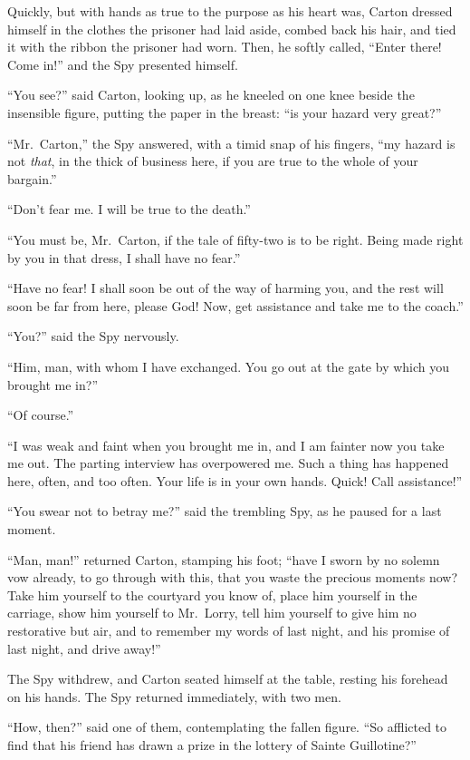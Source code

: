 Quickly, but with hands as true to the purpose as his heart was,
Carton dressed himself in the clothes the prisoner had laid aside,
combed back his hair, and tied it with the ribbon the prisoner had
worn.  Then, he softly called, ``Enter there!  Come in!'' and the Spy
presented himself.

``You see?'' said Carton, looking up, as he kneeled on one knee beside
the insensible figure, putting the paper in the breast:  ``is your
hazard very great?''

``Mr.\ Carton,'' the Spy answered, with a timid snap of his fingers,
``my hazard is not \emph{that}, in the thick of business here, if you are
true to the whole of your bargain.''

``Don't fear me.  I will be true to the death.''

``You must be, Mr.\ Carton, if the tale of fifty-two is to be right.
Being made right by you in that dress, I shall have no fear.''

``Have no fear!  I shall soon be out of the way of harming you, and the
rest will soon be far from here, please God!  Now, get assistance and
take me to the coach.''

``You?'' said the Spy nervously.

``Him, man, with whom I have exchanged.  You go out at the gate by
which you brought me in?''

``Of course.''

``I was weak and faint when you brought me in, and I am fainter now
you take me out.  The parting interview has overpowered me.  Such a
thing has happened here, often, and too often.  Your life is in your
own hands. Quick!  Call assistance!''

``You swear not to betray me?'' said the trembling Spy, as he paused
for a last moment.

``Man, man!'' returned Carton, stamping his foot; ``have I sworn by no
solemn vow already, to go through with this, that you waste the
precious moments now?  Take him yourself to the courtyard you know of,
place him yourself in the carriage, show him yourself to Mr.\ Lorry,
tell him yourself to give him no restorative but air, and to remember
my words of last night, and his promise of last night, and drive away!''

The Spy withdrew, and Carton seated himself at the table, resting his
forehead on his hands.  The Spy returned immediately, with two men.

``How, then?'' said one of them, contemplating the fallen figure.  ``So
afflicted to find that his friend has drawn a prize in the lottery of
Sainte Guillotine?''

